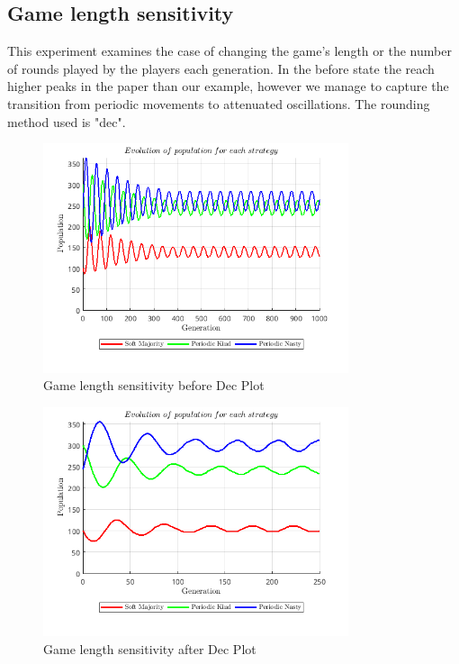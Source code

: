\documentclass[12pt]{article}
\begin{document}
\subsection{Game length sensitivity}
This experiment examines the case of changing the game's length or the number of rounds played by the players each generation. In the before state the reach higher peaks in the paper than our example, however we manage to capture the transition from periodic movements to attenuated oscillations. The rounding method used is "dec".
\begin{figure}[H]
    \centering
    \includegraphics[width=0.8\textwidth]{media/game_length_sensitivity_before_dec.png}
    \caption{Game length sensitivity before Dec Plot}
\end{figure}
\begin{figure}[H]
    \centering
    \includegraphics[width=0.8\textwidth]{media/game_length_sensitivity_after_dec.png}
    \caption{Game length sensitivity after Dec Plot}
\end{figure}
\end{document}
